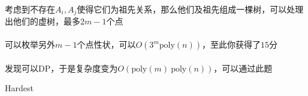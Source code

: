 \documentclass[UTF8]{ctexart}
\begin{document}
\paragraph{}考虑到不存在$A_i,A_j$使得它们为祖先关系，那么他们及祖先组成一棵树，可以处理出他们的虚树，最多$2m-1$个点

\paragraph{}可以枚举另外$m-1$个点性状，可以$O(3^m\mathrm{poly}(n))$，至此你获得了$15$分

\paragraph{}发现可以DP，于是复杂度变为$O(\mathrm{poly}(m)~\mathrm{poly}(n))$，可以通过此题

\clearpage

\begin{center}
	\large{Hardest}
\end{center}
\end{document}
